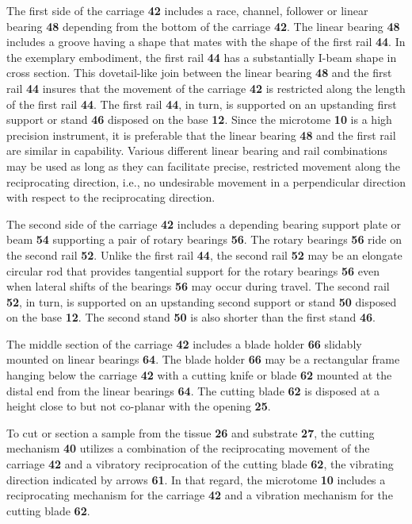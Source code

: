\documentclass{article}
\begin{document}
The first side of the carriage \textbf{42} includes a race, channel, follower or linear bearing \textbf{48} depending from the bottom of the carriage \textbf{42}. The linear bearing \textbf{48} includes a groove having a shape that mates with the shape of the first rail \textbf{44}. In the exemplary embodiment, the first rail \textbf{44} has a substantially I-beam shape in cross section. This dovetail-like join between the linear bearing \textbf{48} and the first rail \textbf{44} insures that the movement of the carriage \textbf{42} is restricted along the length of the first rail \textbf{44}. The first rail \textbf{44}, in turn, is supported on an upstanding first support or stand \textbf{46} disposed on the base \textbf{12}. Since the microtome \textbf{10} is a high precision instrument, it is preferable that the linear bearing \textbf{48} and the first rail are similar in capability. Various different linear bearing and rail combinations may be used as long as they can facilitate precise, restricted movement along the reciprocating direction, i.e., no undesirable movement in a perpendicular direction with respect to the reciprocating direction.

The second side of the carriage \textbf{42} includes a depending bearing support plate or beam \textbf{54} supporting a pair of rotary bearings \textbf{56}. The rotary bearings \textbf{56} ride on the second rail \textbf{52}. Unlike the first rail \textbf{44}, the second rail \textbf{52} may be an elongate circular rod that provides tangential support for the rotary bearings \textbf{56} even when lateral shifts of the bearings \textbf{56} may occur during travel. The second rail \textbf{52}, in turn, is supported on an upstanding second support or stand \textbf{50} disposed on the base \textbf{12}. The second stand \textbf{50} is also shorter than the first stand \textbf{46}.

The middle section of the carriage \textbf{42} includes a blade holder \textbf{66} slidably mounted on linear bearings \textbf{64}. The blade holder \textbf{66} may be a rectangular frame hanging below the carriage \textbf{42} with a cutting knife or blade \textbf{62} mounted at the distal end from the linear bearings \textbf{64}. The cutting blade \textbf{62} is disposed at a height close to but not co-planar with the opening \textbf{25}.

To cut or section a sample from the tissue \textbf{26} and substrate \textbf{27}, the cutting mechanism \textbf{40} utilizes a combination of the reciprocating movement of the carriage \textbf{42} and a vibratory reciprocation of the cutting blade \textbf{62}, the vibrating direction indicated by arrows \textbf{61}. In that regard, the microtome \textbf{10} includes a reciprocating mechanism for the carriage \textbf{42} and a vibration mechanism for the cutting blade \textbf{62}.
\end{document}
